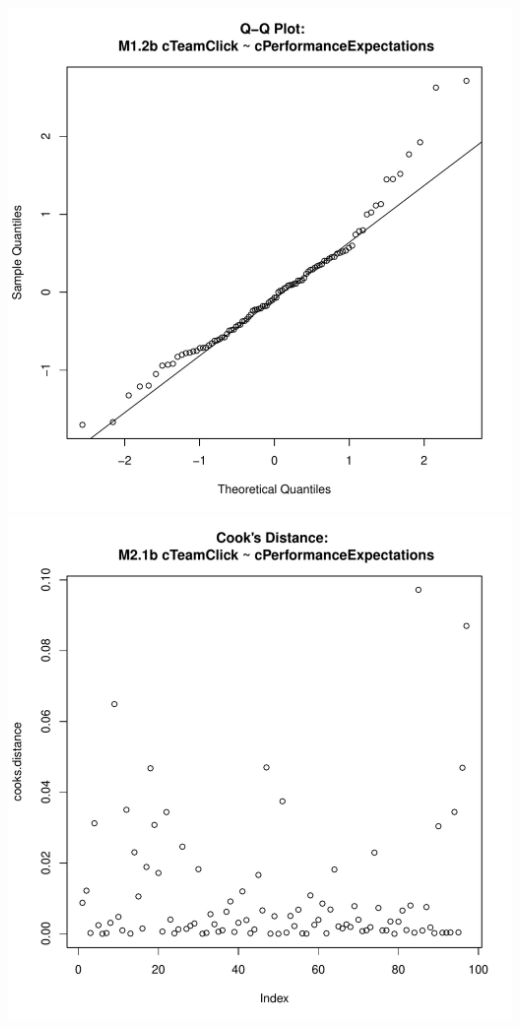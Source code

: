 \documentclass[12pt]{report}
\begin{document}
\includegraphics[scale =.4]{../images/MLM21bQQNorm.pdf}
\includegraphics[scale =.4]{../images/MLM21bCooksD.pdf}
\end{document}
